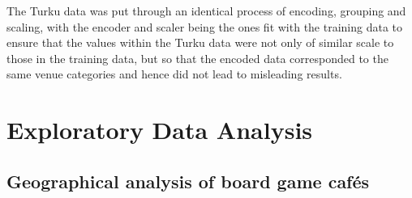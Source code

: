 \documentclass{article}
\begin{document}
    The Turku data was put through an identical process of encoding, grouping and scaling, with the encoder and scaler being the ones fit with the training data to ensure that the values within the Turku data were not only of similar scale to those in the training data, but so that the encoded data corresponded to the same venue categories and hence did not lead to misleading results.


    \section{Exploratory Data Analysis}

    \subsection{Geographical analysis of board game caf\'es}
\end{document}

